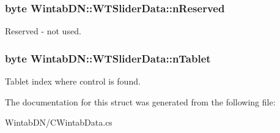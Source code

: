 \hypertarget{struct_wintab_d_n_1_1_w_t_slider_data_a583272c2d4a1a737305fc47ba02b31c1}{
\subsubsection[{nReserved}]{\setlength{\rightskip}{0pt plus 5cm}byte {\bf WintabDN::WTSliderData::nReserved}}}
\label{struct_wintab_d_n_1_1_w_t_slider_data_a583272c2d4a1a737305fc47ba02b31c1}


Reserved -\/ not used. 

\hypertarget{struct_wintab_d_n_1_1_w_t_slider_data_ad7d873006c2202ed8cf64372156480e5}{
\subsubsection[{nTablet}]{\setlength{\rightskip}{0pt plus 5cm}byte {\bf WintabDN::WTSliderData::nTablet}}}
\label{struct_wintab_d_n_1_1_w_t_slider_data_ad7d873006c2202ed8cf64372156480e5}


Tablet index where control is found. 



The documentation for this struct was generated from the following file:\begin{DoxyCompactItemize}
\item 
WintabDN/CWintabData.cs\end{DoxyCompactItemize}
